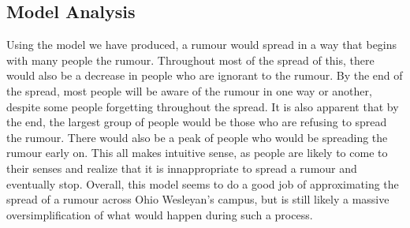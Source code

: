 \documentclass[11pt]{article}
\begin{document}
\subsection{Model Analysis}
Using the model we have produced, a rumour would spread in a way that begins with many people the rumour.
Throughout most of the spread of this, there would also be a decrease in people who are ignorant to the rumour.  
By the end of the spread, most people will be aware of the rumour in one way or another, despite some people forgetting throughout the spread.
It is also apparent that by the end, the largest group of people would be those who are refusing to spread the rumour.
There would also be a peak of people who would be spreading the rumour early on.  
This all makes intuitive sense, as people are likely to come to their senses and realize that it is innappropriate to spread a rumour and eventually stop.  
Overall, this model seems to do a good job of approximating the spread of a rumour across Ohio Wesleyan's campus, but is still likely a massive oversimplification of what would happen during such a process.
\end{document}
